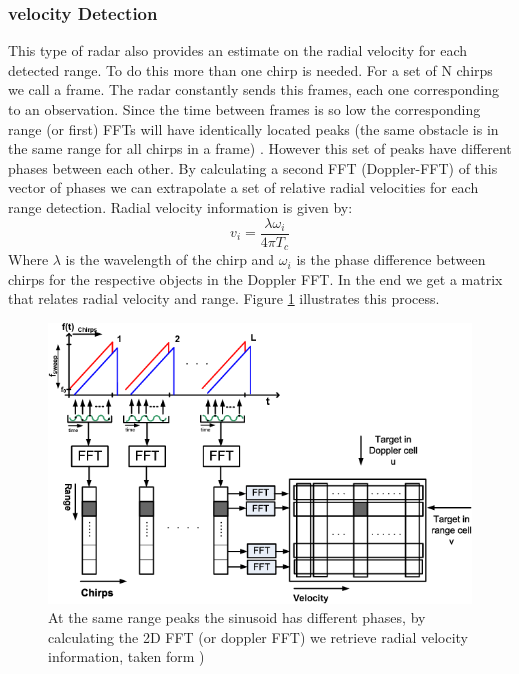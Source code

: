 \subsubsection{velocity Detection}
This type of radar also provides an estimate on the radial velocity for each detected range. To do this more than one chirp is needed. For a set of N chirps we call a frame. The radar constantly sends this frames, each one corresponding to an observation. Since the time between frames is so low the corresponding range (or first) \ac{FFT}s will have  identically located peaks (the same obstacle is in the same range for all chirps in a frame) . However this set of peaks have different phases between each other. By calculating a second \ac{FFT} (Doppler-FFT) of this vector of phases we can extrapolate a set of relative radial velocities  for each range detection. Radial velocity information is given by:
\begin{equation}
    v_i=\frac{\lambda \omega_i}{4 \pi T_c}
    \label{eq:2}
\end{equation}
Where $\lambda$ is the wavelength of the chirp and $\omega_i$ is the phase difference between chirps for the respective objects in the Doppler FFT.
In the end we get a matrix that relates radial velocity and range. 
Figure \ref{fig:matrix} illustrates this process.
\begin{figure}[ht!] 
\centerline{\includegraphics [width=0.8 \textwidth]{imgs/chapter2/dopplerFFT2.png}}
\caption[2D FFT for retrieving velocity information]{At the same range peaks the sinusoid has different phases, by calculating the 2D FFT (or doppler FFT) we retrieve radial velocity information, taken form \cite{schroeder2010x})}
\label{fig:matrix}
\end{figure}


